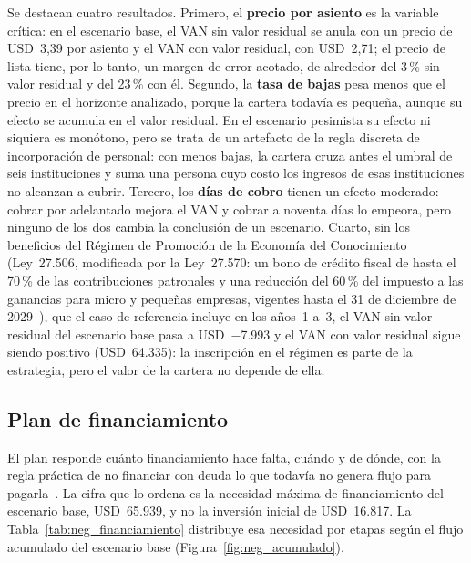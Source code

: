 Se destacan cuatro resultados. Primero, el \textbf{precio por asiento} es la variable crítica: en el escenario base, el VAN sin valor residual se anula con un precio de USD~3,39 por asiento y el VAN con valor residual, con USD~2,71; el precio de lista tiene, por lo tanto, un margen de error acotado, de alrededor del 3\,\% sin valor residual y del 23\,\% con él. Segundo, la \textbf{tasa de bajas} pesa menos que el precio en el horizonte analizado, porque la cartera todavía es pequeña, aunque su efecto se acumula en el valor residual. En el escenario pesimista su efecto ni siquiera es monótono, pero se trata de un artefacto de la regla discreta de incorporación de personal: con menos bajas, la cartera cruza antes el umbral de seis instituciones y suma una persona cuyo costo los ingresos de esas instituciones no alcanzan a cubrir. Tercero, los \textbf{días de cobro} tienen un efecto moderado: cobrar por adelantado mejora el VAN y cobrar a noventa días lo empeora, pero ninguno de los dos cambia la conclusión de un escenario. Cuarto, sin los beneficios del Régimen de Promoción de la Economía del Conocimiento (Ley~27.506, modificada por la Ley~27.570: un bono de crédito fiscal de hasta el 70\,\% de las contribuciones patronales y una reducción del 60\,\% del impuesto a las ganancias para micro y pequeñas empresas, vigentes hasta el 31 de diciembre de 2029~\parencite{Argentina2020Ley27570}), que el caso de referencia incluye en los años~1 a~3, el VAN sin valor residual del escenario base pasa a USD~$-$7.993 y el VAN con valor residual sigue siendo positivo (USD~64.335): la inscripción en el régimen es parte de la estrategia, pero el valor de la cartera no depende de ella.

\subsection{Plan de financiamiento}
\label{sec:neg_financiamiento}

El plan responde cuánto financiamiento hace falta, cuándo y de dónde, con la regla práctica de no financiar con deuda lo que todavía no genera flujo para pagarla~\parencite{UADE2026ModeloNegocio}. La cifra que lo ordena es la necesidad máxima de financiamiento del escenario base, USD~65.939, y no la inversión inicial de USD~16.817. La Tabla~\ref{tab:neg_financiamiento} distribuye esa necesidad por etapas según el flujo acumulado del escenario base (Figura~\ref{fig:neg_acumulado}).

